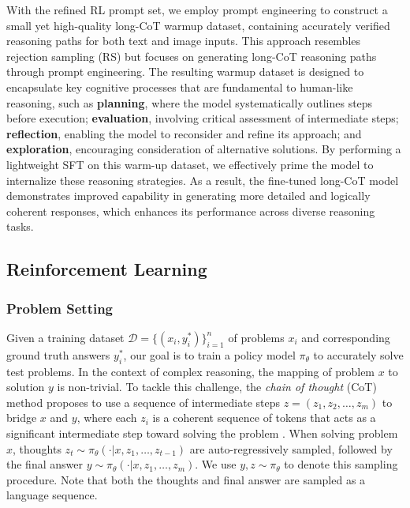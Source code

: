 \documentclass{article}
\newcommand{\citep}[1]{\parencite{#1}}
\begin{document}
With the refined RL prompt set, we employ prompt engineering to construct a small yet high-quality long-CoT warmup dataset, containing accurately verified reasoning paths for both text and image inputs. 
This approach resembles rejection sampling (RS) but focuses on generating long-CoT reasoning paths through prompt engineering. 
The resulting warmup dataset is designed to encapsulate key cognitive processes that are fundamental to human-like reasoning, such as \textbf{planning}, where the model systematically outlines steps before execution; \textbf{evaluation}, involving critical assessment of intermediate steps; \textbf{reflection}, enabling the model to reconsider and refine its approach; and \textbf{exploration}, encouraging consideration of alternative solutions.
By performing a lightweight SFT on this warm-up dataset, we effectively prime the model to internalize these reasoning strategies. As a result, the fine-tuned long-CoT model demonstrates improved capability in generating more detailed and logically coherent responses, which enhances its performance across diverse reasoning tasks.


\subsection{Reinforcement Learning} 
\label{sec:reinforcement_learning}
\subsubsection{Problem Setting}

Given a training dataset $\mathcal{D} =\{(x_i, y^*_i)\}_{i=1}^n$ of problems $x_i$ and corresponding ground truth answers $y^*_i$, our goal is to train a policy model $\pi_\theta$ to accurately solve test problems.  
In the context of complex reasoning, the mapping of problem $x$ to solution $y$ is non-trivial. 
To tackle this challenge, the \emph{chain of thought} (CoT) method proposes to use a sequence of intermediate  steps $z = (z_1, z_2, \dots, z_m)$ to bridge $x$ and $y$, where each $z_i$ is a coherent sequence of  tokens that acts as a significant intermediate step toward solving the problem \citep{wei2022chain}. 
When solving problem $x$, 
 thoughts $z_t\sim \pi_\theta(\cdot | x, z_1,\dots, z_{t-1})$ are auto-regressively sampled, followed by the final answer $y\sim \pi_\theta(\cdot | x, z_1,\dots, z_{m})$. 
We use $y, z\sim \pi_\theta$ to denote this sampling procedure.  Note that both the thoughts and final answer are sampled as a language sequence. 
\end{document}
